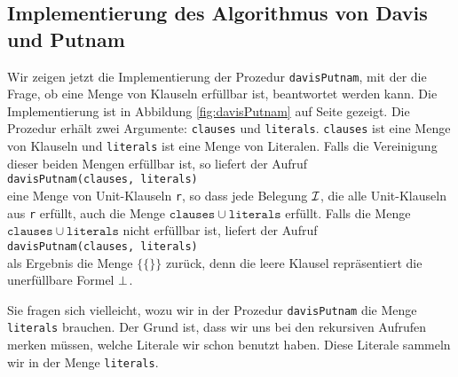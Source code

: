 \subsection{Implementierung des Algorithmus von Davis und Putnam}
Wir zeigen jetzt die Implementierung der Prozedur \texttt{davisPutnam}, 
mit der die Frage, ob eine Menge von Klauseln erf\"{u}llbar ist, beantwortet werden kann. Die
Implementierung ist in Abbildung \ref{fig:davisPutnam} auf Seite \pageref{fig:davisPutnam}
gezeigt.  Die Prozedur erh\"{a}lt zwei Argumente: \texttt{clauses} und \texttt{literals}.
\texttt{clauses} ist eine Menge von Klauseln und \texttt{literals} ist eine Menge von
Literalen.  Falls  die Vereinigung dieser beiden Mengen erf\"{u}llbar ist, so liefert
der Aufruf 
\\[0.2cm]
\hspace*{1.3cm}
\texttt{davisPutnam(clauses, literals)} 
\\[0.2cm]
eine Menge von Unit-Klauseln \texttt{r}, so
dass jede Belegung $\mathcal{I}$, die alle Unit-Klauseln aus \texttt{r} erf\"{u}llt, auch die
Menge $\mathtt{clauses} \cup \mathtt{literals}$ erf\"{u}llt.  Falls die Menge
$\mathtt{clauses} \cup \mathtt{literals}$ nicht erf\"{u}llbar ist, liefert der Aufruf
\\[0.2cm]
\hspace*{1.3cm}
\texttt{davisPutnam(clauses, literals)} 
\\[0.2cm]
als Ergebnis die Menge $\bigl\{ \{\} \bigr\}$ zur\"{u}ck,
denn die leere Klausel repr\"{a}sentiert die unerf\"{u}llbare Formel $\bot$.

Sie fragen sich vielleicht, wozu wir in der Prozedur \texttt{davisPutnam} die Menge
\texttt{literals} brauchen.  Der Grund ist, dass wir uns bei den rekursiven Aufrufen
merken m\"{u}ssen, welche Literale wir schon benutzt haben.  Diese Literale sammeln wir in der
Menge \texttt{literals}.

